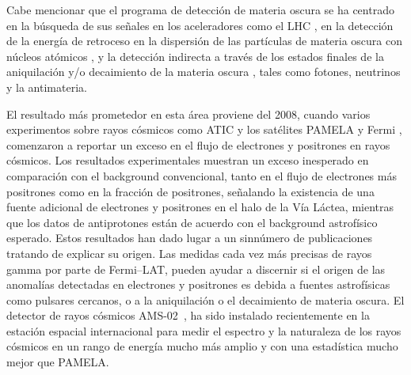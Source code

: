Cabe mencionar que el programa de detección de materia oscura se ha
centrado en la búsqueda de sus señales en los aceleradores como el LHC
\cite{Baltz:2006fm,Cho:2008tj,Nath:2010zj}, en la detección de la
energía de retroceso en la dispersión de las partículas de materia
oscura con núcleos atómicos
\cite{Green:2007rb,Bertone:2007xj,Drees:2008bv,Green:2008rd}, y la
detección indirecta a través de los estados finales de la aniquilación
y/o decaimiento de la materia oscura
\cite{Bertone:2007aw,Eichler:1989br,Arvanitaki:2008hq,Ibarra:2008jk,Ibarra:2008qg,Buckley:2009kw,Ibarra:2009tn,Ruderman:2009ta},
tales como fotones, neutrinos y la antimateria.


El resultado más prometedor en esta área proviene del 2008, cuando
varios experimentos sobre rayos cósmicos como ATIC \cite{} y
los satélites PAMELA \cite{Adriani:2008zr} y Fermi
\cite{Abdo:2009zk}, comenzaron a reportar un exceso en el flujo de
electrones y positrones en rayos cósmicos.
%
Los resultados experimentales muestran un exceso
inesperado en comparación con el background convencional, tanto en el
flujo de electrones más positrones como en la fracción de positrones,
señalando la existencia de una fuente adicional de electrones y
positrones en el halo de la Vía Láctea, mientras que los datos de
antiprotones están de acuerdo con el background astrofísico esperado. 
%
Estos resultados han dado lugar a un sinnúmero de publicaciones
tratando de explicar su origen. Las medidas cada vez más precisas de
rayos gamma por parte de Fermi--LAT, pueden ayudar a discernir si el
origen de las anomalías detectadas en electrones y positrones es
debida a fuentes astrofísicas como pulsares cercanos, o a la
aniquilación o el decaimiento de materia oscura.
%
El detector de rayos cósmicos AMS-02~\cite{ams:2009}, ha sido
instalado recientemente en la estación espacial internacional para
medir el espectro y la naturaleza de los rayos cósmicos en un rango de energía
mucho más amplio y con una estadística mucho mejor que PAMELA.

